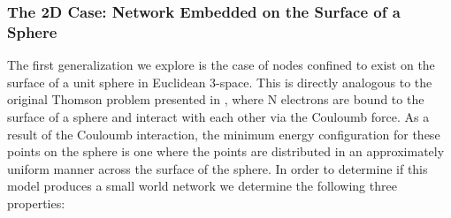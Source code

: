 \documentclass[aps,pre,reprint,superscriptaddress,amsmath,amssymb]{revtex4-1}
\begin{document}
\subsubsection{The 2D Case: Network Embedded on the Surface of a Sphere}
The first generalization we explore is the case of nodes confined to exist on the surface of a unit sphere in Euclidean 3-space.
This is directly analogous to the original Thomson problem presented in \cite{thomson1904}, where N electrons are bound to the surface of a sphere and interact with each other via the Couloumb force.
As a result of the Couloumb interaction, the minimum energy configuration for these points on the sphere is one where the points are distributed in an approximately uniform manner across the surface of the sphere.
In order to determine if this model produces a small world network we determine the following three properties:
\end{document}
